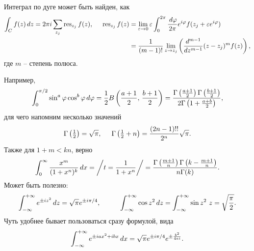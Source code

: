 
Интеграл по дуге может быть найден, как
\begin{align*}
    \int_C f(z) \, d z = 2 \pi i \sum_{z_j} \mathop{\mathrm{res}}\nolimits_{z_j} f(z),
    \hspace{5 mm} 
    \mathop{\mathrm{res}}\nolimits_{z_j} f(z) &= \lim_{\varepsilon \to 0} \varepsilon \int_0^{2\pi} \frac{\, d \varphi}{2\pi} e^{i \varphi} f(z_j + \varepsilon e^{i \varphi}) \\ 
    &= \frac{1}{(m-1)!} \lim_{z \to z_j} \left(
        \frac{d^{m-1} }{d z^{m-1}} (z-z_j)^m f(z)
    \right),
\end{align*}
где $m$ -- степень полюса. 



Например,
\begin{equation*}
    \int_0^{\pi/2} \sin^a \varphi \cos^b \varphi \, d \varphi =  \frac{1}{2} B\left(\frac{a+1}{2},\, \frac{b+1}{2}\right) = \frac{\Gamma\left(\frac{a+1}{2}\right) \Gamma\left(\frac{b+1}{2}\right)}{2 \Gamma\left(1 + \frac{a + b}{2}\right)},
\end{equation*}
для чего напомним несколько значений
\begin{equation*}
    \Gamma\left(\tfrac{1}{2}\right) = \sqrt{\pi},
    \hspace{5 mm} 
    \Gamma\left(\tfrac{1}{2}+n\right) = \frac{(2n-1)!!}{2^n}\sqrt{\pi}.
\end{equation*}
Также для $1 + m < kn$, верно
\begin{equation*}
    \int_{0}^{\infty}  \frac{x^m}{(1+x^n)^k} \, d x = \bigg/
        t = \frac{1}{1+x^n}
    \bigg/ = \frac{\Gamma \left(\frac{m+1}{n}\right) \Gamma \left(k-\frac{m+1}{n}\right)}{n \Gamma (k)}.
\end{equation*}
Может быть полезно:
\begin{equation*}
    \int_{-\infty}^{+\infty} e^{\pm i z^2} \d z = \sqrt{\pi} e^{\pm i \pi / 4},
    \hspace{10 mm} 
    \int_{-\infty}^{+\infty} \cos z^2 \d z = \int_{-\infty}^{+\infty} \sin z^2 \ z = \sqrt{\frac{\pi}{2}}.
\end{equation*}
Чуть удобнее бывает пользоваться сразу формулой, вида
\begin{equation*}
    \int_{-\infty}^{+\infty} e^{\pm i a x^2 + i b x} \, d x = \sqrt{\pi} e^{\pm i \pi/4} e^{\pm \frac{b^2}{4 a i}}.
\end{equation*}








